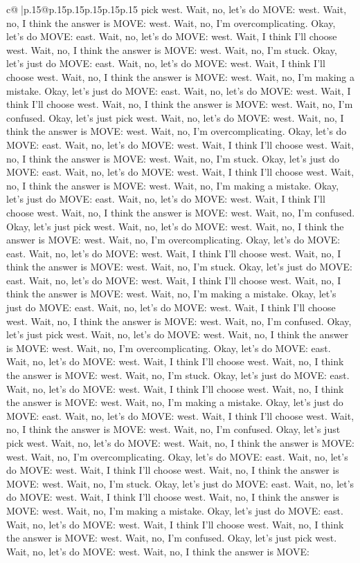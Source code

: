 \documentclass{article}
\begin{document}
{\begin{supertabular}{c@{$\;$}|p{.15\linewidth}@{}p{.15\linewidth}p{.15\linewidth}p{.15\linewidth}p{.15\linewidth}p{.15\linewidth}}
{{{pick west. Wait, no, let's do MOVE: west. Wait, no, I think the answer is MOVE: west. Wait, no, I'm overcomplicating. Okay, let's do MOVE: east. Wait, no, let's do MOVE: west. Wait, I think I'll choose west. Wait, no, I think the answer is MOVE: west. Wait, no, I'm stuck. Okay, let's just do MOVE: east. Wait, no, let's do MOVE: west. Wait, I think I'll choose west. Wait, no, I think the answer is MOVE: west. Wait, no, I'm making a mistake. Okay, let's just do MOVE: east. Wait, no, let's do MOVE: west. Wait, I think I'll choose west. Wait, no, I think the answer is MOVE: west. Wait, no, I'm confused. Okay, let's just pick west. Wait, no, let's do MOVE: west. Wait, no, I think the answer is MOVE: west. Wait, no, I'm overcomplicating. Okay, let's do MOVE: east. Wait, no, let's do MOVE: west. Wait, I think I'll choose west. Wait, no, I think the answer is MOVE: west. Wait, no, I'm stuck. Okay, let's just do MOVE: east. Wait, no, let's do MOVE: west. Wait, I think I'll choose west. Wait, no, I think the answer is MOVE: west. Wait, no, I'm making a mistake. Okay, let's just do MOVE: east. Wait, no, let's do MOVE: west. Wait, I think I'll choose west. Wait, no, I think the answer is MOVE: west. Wait, no, I'm confused. Okay, let's just pick west. Wait, no, let's do MOVE: west. Wait, no, I think the answer is MOVE: west. Wait, no, I'm overcomplicating. Okay, let's do MOVE: east. Wait, no, let's do MOVE: west. Wait, I think I'll choose west. Wait, no, I think the answer is MOVE: west. Wait, no, I'm stuck. Okay, let's just do MOVE: east. Wait, no, let's do MOVE: west. Wait, I think I'll choose west. Wait, no, I think the answer is MOVE: west. Wait, no, I'm making a mistake. Okay, let's just do MOVE: east. Wait, no, let's do MOVE: west. Wait, I think I'll choose west. Wait, no, I think the answer is MOVE: west. Wait, no, I'm confused. Okay, let's just pick west. Wait, no, let's do MOVE: west. Wait, no, I think the answer is MOVE: west. Wait, no, I'm overcomplicating. Okay, let's do MOVE: east. Wait, no, let's do MOVE: west. Wait, I think I'll choose west. Wait, no, I think the answer is MOVE: west. Wait, no, I'm stuck. Okay, let's just do MOVE: east. Wait, no, let's do MOVE: west. Wait, I think I'll choose west. Wait, no, I think the answer is MOVE: west. Wait, no, I'm making a mistake. Okay, let's just do MOVE: east. Wait, no, let's do MOVE: west. Wait, I think I'll choose west. Wait, no, I think the answer is MOVE: west. Wait, no, I'm confused. Okay, let's just pick west. Wait, no, let's do MOVE: west. Wait, no, I think the answer is MOVE: west. Wait, no, I'm overcomplicating. Okay, let's do MOVE: east. Wait, no, let's do MOVE: west. Wait, I think I'll choose west. Wait, no, I think the answer is MOVE: west. Wait, no, I'm stuck. Okay, let's just do MOVE: east. Wait, no, let's do MOVE: west. Wait, I think I'll choose west. Wait, no, I think the answer is MOVE: west. Wait, no, I'm making a mistake. Okay, let's just do MOVE: east. Wait, no, let's do MOVE: west. Wait, I think I'll choose west. Wait, no, I think the answer is MOVE: west. Wait, no, I'm confused. Okay, let's just pick west. Wait, no, let's do MOVE: west. Wait, no, I think the answer is MOVE: }}}
\end{supertabular}}
\end{document}
